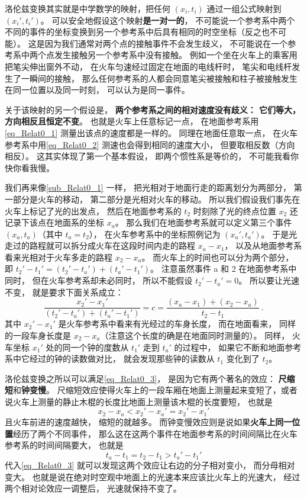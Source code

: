 洛伦兹变换其实就是中学数学的映射，把任何 $(x_i, t_i)$ 通过一组公式映射到 $(x_i', t_i')$。 可以安全地假设这个映射\textbf{是一对一的}， 不可能说一个参考系中两个不同的事件的坐标变换到另一个参考系中后具有相同的时空坐标（反之也不可能）。 这是因为我们通常对两个点的接触事件不会发生歧义， 不可能说在一个参考系中两个点发生接触另一个参考系中没有接触。 例如一个坐在火车上的乘客用把笔尖伸出窗外不动， 在火车匀速经过固定在地面的电线杆时， 笔尖和电线杆发生了一瞬间的接触， 那么任何参考系的人都会同意笔尖被接触和柱子被接触发生在同一位置以及同一时刻， 可以认为是同一事件。

关于该映射的另一个假设是， \textbf{两个参考系之间的相对速度没有歧义： 它们等大， 方向相反且恒定不变}。 也就是火车上任意标记一点， 在地面参考系用\autoref{eq_Relat0_1} 测量出该点的速度都是一样的。 同理在地面任意取一点， 在火车参考系中用\autoref{eq_Relat0_2} 测速也会得到相同的速度大小， 但要取相反数（方向相反）。 这其实体现了第一个基本假设， 即两个惯性系是等价的， 不可能我看你快你看我慢。

我们再来像\autoref{sub_Relat0_1} 一样， 把光相对于地面行走的距离划分为两部分， 第一部分是火车的移动， 第二部分是光相对火车的移动。 所以我们假设我们事先在火车上标记了光的出发点， 然后在地面参考系的 $t_2$ 时刻除了光的终点位置 $x_2$ 还记录下该点在地面系的坐标 $x_a$。 那么我们在地面参考系就可以定义第三个事件 $(x_a, t_a)$（其中 $t_a = t_2$）， 在火车参考系中的坐标照例记为 $(x_a', t_a')$。 于是光走过的路程就可以拆分成火车在这段时间内走的路程 $x_a - x_1$， 以及从地面参考系看来光相对于火车多走的路程 $x_2 - x_a$。 而火车上的时间也可以分为两个部分， 即 $t_2' - t_1' = (t_2' - t_a') + (t_a' - t_1')$。 注意虽然事件 a 和 2 在地面参考系中同时， 但在火车参考系却未必同时， 所以不能假设 $t_2' - t_a' = 0$。 所以要让光速不变， 就是要求下面关系成立：
\begin{equation}\label{eq_Relat0_3}
\frac{x_2' - x_1'}{(t_2' - t_a') + (t_a' - t_1')} = c = \frac{(x_a - x_1) + (x_2 - x_a)}{t_2 - t_1}~.
\end{equation}
其中 $x_2' - x_1'$ 是火车参考系中看来有光经过的车身长度， 而在地面看来， 同样的一段车身长度是 $x_2 - x_a$（注意这个长度的确是在地面同时测量的）。 同样， 火车坐标 $x_1'$ 处的同一个钟的度数从 $t_1'$ 走到 $t_a'$ 的过程中， 如果它不断和地面参考系中它经过的钟的读数做对比， 就会发现那些钟的读数从 $t_1$ 变化到了 $t_2$。

洛伦兹变换之所以可以满足\autoref{eq_Relat0_3}， 是因为它有两个著名的效应： \textbf{尺缩短}和\textbf{钟变慢}。 尺缩短效应使得火车上的一段车厢在地面上测量起来变短了，或者说火车上测量的静止木棍的长度比地面上测量该木棍的长度要短， 也就是
\begin{equation}
x_2 - x_a < x_2'-x_a' = x_2' - x_1'
\end{equation}
且火车前进的速度越快， 缩短的就越多。 而钟变慢效应则是说如果\textbf{火车上同一位置}经历了两个不同事件， 那么这在这两个事件在地面参考系的时间间隔比在火车参考系的时间间隔要大， 也就是
\begin{equation}
t_a - t_1 = t_2 - t_1 > t_a' - t_1'
\end{equation}
代入\autoref{eq_Relat0_3} 就可以发现这两个效应让右边的分子相对变小， 而分母相对变大。 也就是说在绝对时空观中地面上的光速本来应该比火车上的光速大， 经过两个相对论效应一调整后， 光速就保持不变了。

